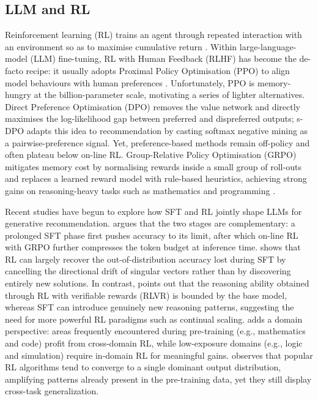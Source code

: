 \subsection{LLM and RL}
Reinforcement learning (RL) trains an agent through repeated interaction with an environment so as to maximise cumulative return \citep{RLsurvey,RLsurvey2}. Within large-language-model (LLM) fine-tuning, RL with Human Feedback (RLHF) has become the de-facto recipe: it usually adopts Proximal Policy Optimisation (PPO) \citep{PPO} to align model behaviours with human preferences \citep{RLHF}. Unfortunately, PPO is memory-hungry at the billion-parameter scale, motivating a series of lighter alternatives. Direct Preference Optimisation (DPO) \citep{DPO} removes the value network and directly maximises the log-likelihood gap between preferred and dispreferred outputs; s-DPO \citep{sdpo} adapts this idea to recommendation by casting softmax negative mining as a pairwise-preference signal. Yet, preference-based methods remain off-policy and often plateau below on-line RL. Group-Relative Policy Optimisation (GRPO) \citep{deepseekmath} mitigates memory cost by normalising rewards inside a small group of roll-outs and replaces a learned reward model with rule-based heuristics, achieving strong gains on reasoning-heavy tasks such as mathematics and programming \citep{Deepseek-r1,o1}. 

Recent studies have begun to explore how SFT and RL jointly shape LLMs for generative recommendation.  
\citep{SFT-then-RL} argues that the two stages are complementary: a prolonged SFT phase first pushes accuracy to its limit, after which on-line RL with GRPO further compresses the token budget at inference time.  
\citep{RLvsSFT} shows that RL can largely recover the out-of-distribution accuracy lost during SFT by cancelling the directional drift of singular vectors rather than by discovering entirely new solutions.  
In contrast, \citep{RLReallyLearn} points out that the reasoning ability obtained through RL with verifiable rewards (RLVR) is bounded by the base model, whereas SFT can introduce genuinely new reasoning patterns, suggesting the need for more powerful RL paradigms such as continual scaling.  
\citep{RevisitingRL} adds a domain perspective: areas frequently encountered during pre-training (e.g., mathematics and code) profit from cross-domain RL, while low-exposure domains (e.g., logic and simulation) require in-domain RL for meaningful gains.  
\citep{EchoRL} observes that popular RL algorithms tend to converge to a single dominant output distribution, amplifying patterns already present in the pre-training data, yet they still display cross-task generalization.